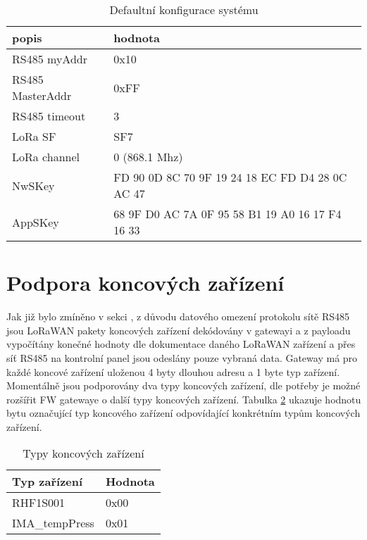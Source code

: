 \newpage

\begin{longtable} { |l|p{7cm}| }
    \caption{Defaultní konfigurace systému} 
    \label{table:5} \\
     \hline
     popis              & hodnota         \\ \hline \hline
     RS485 myAddr       & 0x10            \\ \hline
     RS485 MasterAddr   & 0xFF            \\ \hline
     RS485 timeout      & 3               \\ \hline
     LoRa SF            & SF7             \\ \hline
     LoRa channel       & 0 (868.1 Mhz)   \\ \hline
     NwSKey             & FD 90 0D 8C 70 9F 19 24 18 EC FD D4 28 0C AC 47  \\ \hline
     AppSKey            & 68 9F D0 AC 7A 0F 95 58 B1 19 A0 16 17 F4 16 33  \\ \hline
\end{longtable}



\section{Podpora koncových zařízení}
Jak již bylo zmíněno v sekci \label{Implementace WSN do přístupového systému}, z důvodu datového omezení protokolu sítě RS485 jsou LoRaWAN pakety koncových zařízení dekódovány v gatewayi a z payloadu vypočítány konečné hodnoty dle dokumentace daného LoRaWAN zařízení a přes síť RS485 na kontrolní panel jsou odeslány pouze vybraná data. Gateway má pro každé koncové zařízení uloženou 4 byty dlouhou adresu a 1 byte typ zařízení.
Momentálně jsou podporovány dva typy koncových zařízení, dle potřeby je možné rozšířit FW gatewaye o další typy koncových zařízení. Tabulka \ref{table:TypyKoncZarizeni} ukazuje hodnotu bytu označující typ koncového zařízení odpovídající konkrétním typům koncových zařízení.

\begin{longtable} { |l|l| }
    \caption{Typy koncových zařízení} 
    \label{table:TypyKoncZarizeni} \\
    \hline
     Typ zařízení       & Hodnota         \\ \hline 
     RHF1S001           & 0x00            \\ 
     IMA\_tempPress     & 0x01            \\ \hline     
\end{longtable}

